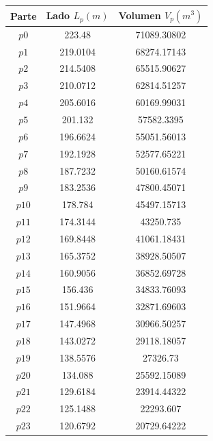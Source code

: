 \documentclass[12pt]{article}
\begin{document}
\begin{center}
\begin{tabular}{||c c c||} 
 \hline
 Parte & Lado $L_p (m)$ & Volumen $V_p (m^3)$\\ [0.5ex] 
 \hline\hline
$p0$ 	&	223.48	 &	71089.30802 \\
$p1$ 	&	219.0104	 &	68274.17143 \\
$p2$ 	&	214.5408	 &	65515.90627 \\
$p3$ 	&	210.0712	 &	62814.51257 \\
$p4$	 &	205.6016	 &	60169.99031  \\
$p5$ &	201.132	&	57582.3395 \\
$p6$	 &	196.6624 	&	55051.56013 \\
$p7$ &	192.1928	 &	52577.65221 \\
$p8$	 &	187.7232	 &	50160.61574 \\
$p9$	 &	183.2536	 &	47800.45071 \\
$p10$	 &	178.784	&	45497.15713 \\
$p11$	 &	174.3144 	&	43250.735 \\
$p12$	 &	169.8448	 &	41061.18431 \\
$p13$	 &	165.3752	 &	38928.50507 \\
$p14	$ &	160.9056	 &	36852.69728 \\
$p15 $	 &	156.436	&	34833.76093 \\
$p16$ 	 &	151.9664	 &	32871.69603 \\
$p17$	 &	147.4968	 &	30966.50257 \\
$p18$	 &	143.0272	 &	29118.18057 \\
$p19$	 &	138.5576	 &	27326.73 \\
$p20$	 &	134.088	 &	25592.15089 \\
$p21$	 &	129.6184	 &	23914.44322 \\
$p22$	 &	125.1488	 &	22293.607 \\
$p23$	 &	120.6792	 &	20729.64222 \\[1ex]
\hline
\end{tabular}



\end{center}
\end{document}
